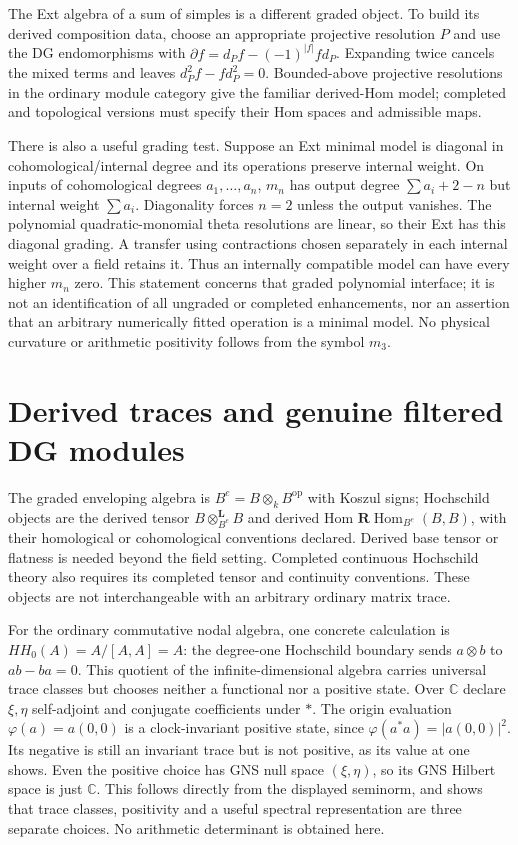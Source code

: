 \documentclass[11pt,oneside,openany]{book}
\theoremstyle{definition}\newtheorem{definition}[theorem]{Definition}
\theoremstyle{remark}\newtheorem{remark}[theorem]{Remark}
\begin{document}
The Ext algebra of a sum of simples is a different graded object. To build
its derived composition data, choose an appropriate projective resolution
$P$ and use the DG endomorphisms with
$\partial f=d_Pf-(-1)^{|f|}fd_P$. Expanding twice cancels the mixed terms
and leaves $d_P^2f-fd_P^2=0$. Bounded-above projective resolutions in the
ordinary module category give the familiar derived-Hom model; completed
and topological versions must specify their Hom spaces and admissible maps.

There is also a useful grading test. Suppose an Ext minimal model is diagonal
in cohomological/internal degree and its operations preserve internal weight.
On inputs of cohomological degrees $a_1,\ldots,a_n$, $m_n$ has output
degree $\sum a_i+2-n$ but internal weight $\sum a_i$. Diagonality forces
$n=2$ unless the output vanishes. The polynomial quadratic-monomial theta
resolutions are linear, so their Ext has this diagonal grading. A transfer
using contractions chosen separately in each internal weight over a field
retains it. Thus an internally compatible model can have every higher
$m_n$ zero. This statement concerns that graded polynomial interface; it
is not an identification of all ungraded or completed enhancements, nor
an assertion that an arbitrary numerically fitted operation is a minimal
model. No physical curvature or arithmetic positivity follows from the
symbol $m_3$.


\section{Derived traces and genuine filtered DG modules}
The graded enveloping algebra is $B^e=B\otimes_k B^{\mathrm{op}}$ with
Koszul signs; Hochschild objects are the derived tensor
$B\otimes^{\mathbf L}_{B^e}B$ and derived Hom
$\mathbf R\operatorname{Hom}_{B^e}(B,B)$, with their homological or
cohomological conventions declared. Derived base tensor or flatness is
needed beyond the field setting. Completed continuous Hochschild theory
also requires its completed tensor and continuity conventions. These
objects are not interchangeable with an arbitrary ordinary matrix trace.

For the ordinary commutative nodal algebra, one concrete calculation is
$HH_0(A)=A/[A,A]=A$: the degree-one Hochschild boundary sends
$a\otimes b$ to $ab-ba=0$. This quotient of the infinite-dimensional algebra carries universal trace
classes but chooses neither a functional nor a positive state. Over $\mathbb C$ declare
$\xi,\eta$ self-adjoint and conjugate coefficients under $*$. The
origin evaluation $\varphi(a)=a(0,0)$ is a clock-invariant positive state,
since $\varphi(a^*a)=|a(0,0)|^2$. Its negative is still an invariant trace
but is not positive, as its value at one shows. Even the positive choice
has GNS null space $(\xi,\eta)$, so its GNS Hilbert space is just
$\mathbb C$. This follows directly from the displayed seminorm, and
shows that trace classes, positivity and a useful spectral representation
are three separate choices. No arithmetic determinant is obtained here.
\end{document}
